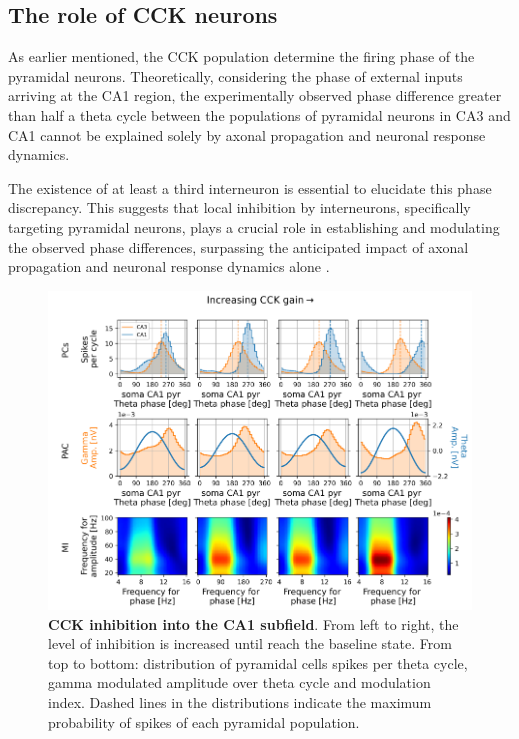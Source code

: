 \documentclass[../main.tex]{subfiles}
\begin{document}
\subsection{The role of CCK neurons}
As earlier mentioned, the CCK population determine the firing phase of the pyramidal neurons. 
Theoretically, considering the phase of external inputs arriving at the CA1 region, the experimentally observed phase difference greater than half a theta cycle between the populations of pyramidal neurons in CA3 and CA1 cannot be explained solely by axonal propagation and neuronal response dynamics.

The existence of at least a third interneuron is essential to elucidate this phase discrepancy.
This suggests that local inhibition by interneurons, specifically targeting pyramidal neurons, plays a crucial role in establishing and modulating the observed phase differences, surpassing the anticipated impact of axonal propagation and neuronal response dynamics alone \citep{mizuseki_theta_2009,cutsuridis_computational_2015}.
\begin{figure}[!htb]
    \centering
    \includegraphics[width=\textwidth]{chapter4/figures/cckCA1_gain.png}
    \caption{\textbf{CCK inhibition into the CA1 subfield}.
    From left to right, the level of inhibition is increased until reach the baseline state.
    From top to bottom: distribution of pyramidal cells spikes per theta cycle,
    gamma modulated amplitude over theta cycle and modulation index.
    Dashed lines in the distributions indicate the maximum probability of spikes of each pyramidal population.}
    \label{fig:cck-gain}
\end{figure}
\end{document}
